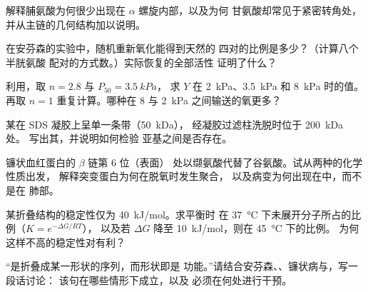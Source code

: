 \begin{exercise}[$\star\star$]\label{exo:b1:proteins:6}
解释脯氨酸为何很少出现在 $\alpha$ 螺旋内部，以及为何
甘氨酸却常见于紧密转角处，并从主链的几何结构加以说明。
\end{exercise}

\begin{exercise}[$\star\star$]\label{exo:b1:proteins:7}
在安芬森的实验中，随机重新氧化能得到天然的
四对的比例是多少？（计算八个半胱氨酸
配对的方式数。）实际恢复的全部活性
证明了什么？
\end{exercise}

\begin{exercise}[$\star\star$]\label{exo:b1:proteins:8}
利用，取 $n = 2.8$ 与 $P_{50} = \qty{3.5}{kPa}$，
求 $Y$ 在 \qty{2}{kPa}、\qty{3.5}{kPa} 和 \qty{8}{kPa} 时的值。
再取 $n = 1$ 重复计算。哪种在 \qty{8}{} 与
\qty{2}{kPa} 之间输送的氧更多？
\end{exercise}

\begin{exercise}[$\star\star$]\label{exo:b1:proteins:9}
某在 SDS 凝胶上呈单一条带（\qty{50}{kDa}），
经凝胶过滤柱洗脱时位于 \qty{200}{kDa} 处。
写出其，并说明如何检验
亚基之间是否存在。
\end{exercise}

\begin{exercise}[$\star\star\star$]\label{exo:b1:proteins:10}
镰状血红蛋白的 $\beta$ 链第 6 位（表面）
处以缬氨酸代替了谷氨酸。试从两种的化学性质出发，
解释突变蛋白为何在脱氧时发生聚合，
以及病变为何出现在中，而不是在
肺部。
\end{exercise}

\begin{exercise}[$\star\star\star$]\label{exo:b1:proteins:11}
某折叠结构的稳定性仅为 \qty{40}{kJ/mol}。求平衡时
在 \qty{37}{\celsius} 下未展开分子所占的比例（$K = e^{-\Delta G/RT}$），
以及若 $\Delta G$ 降至 \qty{10}{kJ/mol}，则在 \qty{45}{\celsius} 下的比例。
为何这样不高的稳定性对有利？
\end{exercise}

\begin{exercise}[$\star\star\star$]\label{exo:b1:proteins:12}
“是折叠成某一形状的序列，而形状即是
功能。”请结合安芬森、、镰状病与，写一段话讨论：
该句在哪些情形下成立，以及
必须在何处进行干预。
\end{exercise}


